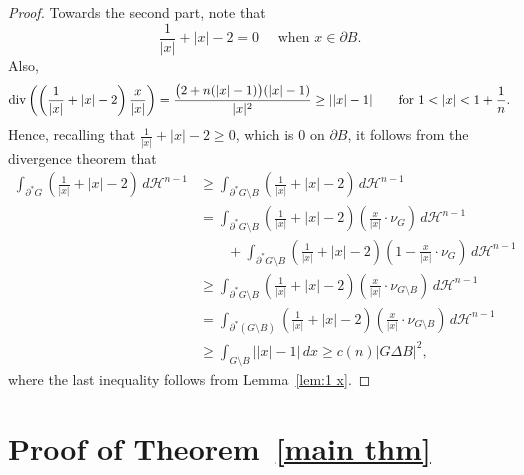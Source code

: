 \documentclass[reqno,11pt]{amsart}
\numberwithin{equation}{section}
\theoremstyle{remark}
\begin{document}
\begin{proof}
Towards the second part,  note that
$$\frac{1}{|x|}+|x|-2 =0 \quad \text{ when } x\in \partial B.$$
Also, 
\begin{align*}
{\rm div}\left(\left(\frac{1}{|x|}+|x|-2\right) \frac{x}{|x|}\right)
= \frac{\big(2+n(|x|-1)\big)(|x|-1)}{|x|^2} \geq ||x|-1| \qquad \text{for $1<|x|<1 + \frac 1 n$}.
\end{align*}
Hence, recalling that $\frac{1}{|x|}+|x|-2\geq 0$, which is $0$ on $\partial B$, it follows from  the divergence theorem that
\begin{align*}
\int_{\partial^*  G}   \left( \frac{1}{|x|}+|x|-2\right)\, d\mathscr H^{n-1} &\ge \int_{\partial^*G \setminus B}\left(\frac{1}{|x|}+|x|-2\right)\, d\mathscr H^{n-1}\\
&=  \int_{\partial^*  G\setminus B}   \left(\frac{1}{|x|}+|x|-2\right) \left(\frac{x}{|x|}\cdot \nu_G\right)\, d\mathscr H^{n-1} \\
&\qquad +\int_{\partial^*  G \setminus B}   \left(\frac{1}{|x|}+|x|-2\right) \left(1-\frac{x}{|x|}\cdot \nu_G\right)\, d\mathscr H^{n-1}\\
& \ge \int_{\partial^*  G\setminus B}   \left(\frac{1}{|x|}+|x|-2\right) \left(\frac{x}{|x|}\cdot \nu_{G\setminus B}\right)\, d\mathscr H^{n-1}\\
&= \int_{\partial^*  (G\setminus B)}   \left(\frac{1}{|x|}+|x|-2\right) \left(\frac{x}{|x|}\cdot \nu_{G\setminus B}\right)\, d\mathscr H^{n-1} \\
& \ge  \int_{ G\setminus B }   \left| |x|-1\right|\, dx \ge c(n)|G\Delta B|^2,
\end{align*}
where the last inequality follows from   Lemma~\ref{lem:1 x}.
\end{proof}


 
 \section{Proof of Theorem~\ref{main thm}}\label{main proof}
 
\end{document}
